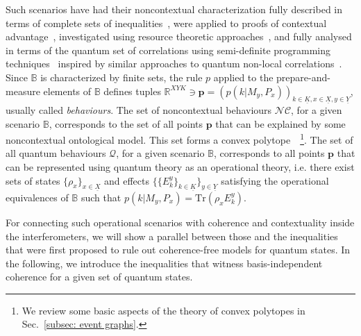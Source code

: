 \documentclass[letterpaper,onecolumn,12pt,accepted=2024-01-17]{article}
\begin{document}
Such scenarios have had their noncontextual characterization fully described in terms of complete sets of inequalities~\cite{schmid2018all}, were applied to proofs of contextual advantage~\cite{schmid2018discrimination,Lostaglio2020contextualadvantage,lostaglio_certifying_2020}, investigated using resource theoretic approaches~\cite{Duarte18,wagner2021using}, and fully analysed in terms of the quantum set of correlations using semi-definite programming techniques~\cite{chaturvedi2021characterising,tavakoli2021bounding} inspired by similar approaches to quantum non-local correlations~\cite{navascues2007bounding}. Since $\mathbb{B}$ is characterized by finite sets, the rule $p$ applied to the prepare-and-measure elements of $\mathbb{B}$ defines tuples $\mathbb{R}^{XYK} \ni \mathbf{p} = (p(k \vert M_y,P_x))_{k \in \underline{K}, x \in \underline{X}, y \in \underline{Y}}$, usually called \textit{behaviours}. The set of noncontextual behaviours $\mathcal{NC}$, for a given scenario $\mathbb{B}$, corresponds to the set of all points $\mathbf{p}$ that can be explained by some noncontextual ontological model. { This set forms a convex polytope~\cite{schmid2018all}~\footnote{{We review some basic aspects of the theory of convex polytopes in Sec.~\ref{subsec: event graphs}.}}.} The set of all quantum behaviours $\mathcal{Q}$, for a given scenario $\mathbb{B}$, corresponds to all points $\mathbf{p}$ that can be represented using quantum theory as an operational theory, i.e. there exist sets of states $\{\rho_x\}_{x \in \underline{X}}$ and effects $\{\{E_k^y\}_{k \in \underline{K}}\}_{y \in \underline{Y}}$ satisfying the operational equivalences of $\mathbb{B}$ such that $p(k \vert M_y,P_x) = \text{Tr}(\rho_x E_k^y)$. 

For connecting such operational scenarios with coherence and contextuality inside the interferometers, we will show a parallel between those and the inequalities that were first proposed to rule out coherence-free models for quantum states. In the following, we introduce the inequalities that witness basis-independent coherence for a given set of quantum states.
\end{document}
